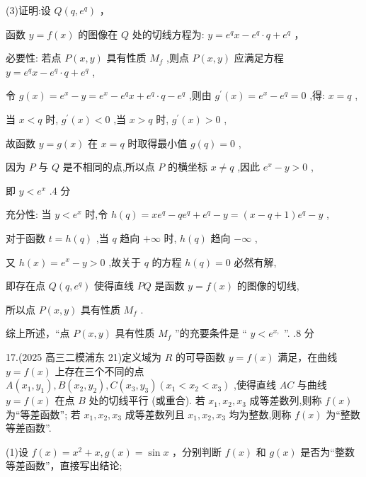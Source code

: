 \documentclass[10pt]{article}
\begin{document}
(3)证明:设 \(Q\left( {q,{e}^{q}}\right)\) ，

函数 \(y = f\left( x\right)\) 的图像在 \(Q\) 处的切线方程为: \(y = {e}^{q}x - {e}^{q} \cdot  q + {e}^{q}\) ，

必要性: 若点 \(P\left( {x,y}\right)\) 具有性质 \({M}_{f}\) ,则点 \(P\left( {x,y}\right)\) 应满足方程 \(y = {e}^{q}x - {e}^{q} \cdot  q + {e}^{q}\) ,

令 \(g\left( x\right)  = {e}^{x} - y = {e}^{x} - {e}^{q}x + {e}^{q} \cdot  q - {e}^{q}\) ,则由 \({g}^{\prime }\left( x\right)  = {e}^{x} - {e}^{q} = 0\) ,得: \(x = q\) ,

当 \(x < q\) 时, \({g}^{\prime }\left( x\right)  < 0\) ,当 \(x > q\) 时, \({g}^{\prime }\left( x\right)  > 0\) ,

故函数 \(y = g\left( x\right)\) 在 \(x = q\) 时取得最小值 \(g\left( q\right)  = 0\) ,

因为 \(P\) 与 \(Q\) 是不相同的点,所以点 \(P\) 的横坐标 \(x \neq  q\) ,因此 \({e}^{x} - y > 0\) ,

即 \(y < {e}^{x}\) .4 分

充分性: 当 \(y < {e}^{x}\) 时,令 \(h\left( q\right)  = x{e}^{q} - q{e}^{q} + {e}^{q} - y = \left( {x - q + 1}\right) {e}^{q} - y\) ,

对于函数 \(t = h\left( q\right)\) ,当 \(q\) 趋向 \(+ \infty\) 时, \(h\left( q\right)\) 趋向 \(- \infty\) ,

又 \(h\left( x\right)  = {e}^{x} - y > 0\) ,故关于 \(q\) 的方程 \(h\left( q\right)  = 0\) 必然有解,

即存在点 \(Q\left( {q,{e}^{q}}\right)\) 使得直线 \({PQ}\) 是函数 \(y = f\left( x\right)\) 的图像的切线,

所以点 \(P\left( {x,y}\right)\) 具有性质 \({M}_{f}\) .

综上所述，“点 \(P\left( {x,y}\right)\) 具有性质 \({M}_{f}\) ”的充要条件是 “ \(y < {e}^{x,}\) ”. .8 分

17.(2025 高三二模浦东 21)定义域为 \(R\) 的可导函数 \(y = f\left( x\right)\) 满足，在曲线 \(y = f\left( x\right)\) 上存在三个不同的点 \(A\left( {{x}_{1},{y}_{1}}\right) ,B\left( {{x}_{2},{y}_{2}}\right) ,C\left( {{x}_{3},{y}_{3}}\right) \left( {{x}_{1} < {x}_{2} < {x}_{3}}\right)\) ,使得直线 \({AC}\) 与曲线 \(y = f\left( x\right)\) 在点 \(B\) 处的切线平行 (或重合). 若 \({x}_{1},{x}_{2},{x}_{3}\) 成等差数列,则称 \(f\left( x\right)\) 为“等差函数”; 若 \({x}_{1},{x}_{2},{x}_{3}\) 成等差数列且 \({x}_{1},{x}_{2},{x}_{3}\) 均为整数,则称 \(f\left( x\right)\) 为“整数等差函数”.

(1)设 \(f\left( x\right)  = {x}^{2} + x,g\left( x\right)  = \sin x\) ，分别判断 \(f\left( x\right)\) 和 \(g\left( x\right)\) 是否为“整数等差函数”，直接写出结论;
\end{document}

